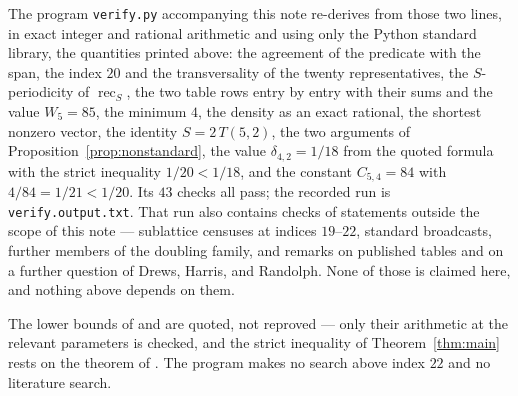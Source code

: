 \documentclass[11pt]{amsart}
\theoremstyle{remark}
\newcommand{\dens}{\delta}
\newcommand{\rec}{\operatorname{rec}}
\newcommand{\Tstd}{T}
\begin{document}
The program \texttt{verify.py} accompanying this note re-derives from those two
lines, in exact integer and rational arithmetic and using only the Python
standard library, the quantities printed above: the agreement of the predicate
with the span, the index $20$ and the transversality of the twenty
representatives, the $S$-periodicity of $\rec_S$, the two table rows entry by
entry with their sums and the value $W_5=85$, the minimum $4$, the density as an
exact rational, the shortest nonzero vector, the identity $S=2\,\Tstd(5,2)$, the
two arguments of Proposition~\ref{prop:nonstandard}, the value
$\dens_{4,2}=1/18$ from the quoted formula with the strict inequality
$1/20<1/18$, and the constant $C_{5,4}=84$ with $4/84=1/21<1/20$. Its $43$
checks all pass; the recorded run is \texttt{verify.output.txt}. That run also
contains checks of statements outside the scope of this note --- sublattice
censuses at indices $19$--$22$, standard broadcasts, further members of the
doubling family, and remarks on published tables and on a further question of
Drews, Harris, and Randolph. None of those is claimed here, and nothing above
depends on them.

The lower bounds of \cite{DHR} and \cite{Shlomi} are quoted, not reproved --- only
their arithmetic at the relevant parameters is checked, and the strict inequality
of Theorem~\ref{thm:main} rests on the theorem of \cite{DHR}. The program makes no
search above index $22$ and no literature search.
\end{document}
